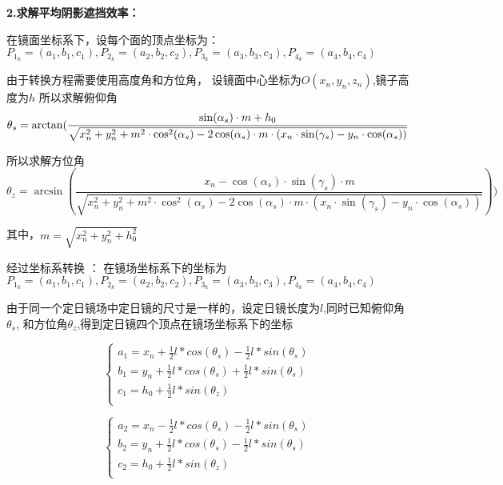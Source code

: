 \documentclass{数学建模}
\begin{document}
\textbf{2.求解平均阴影遮挡效率：}


在镜面坐标系下，设每个面的顶点坐标为：
$P_{1_k}=(a_1,b_1,c_1),P_{2_k}=(a_2,b_2,c_2),P_{3_k}=(a_3,b_3,c_3)
,P_{4_k}=(a_4,b_4,c_4)$

由于转换方程需要使用高度角和方位角，
设镜面中心坐标为$O(x_n,y_n,z_n)$,镜子高度为$h$
所以求解俯仰角
\begin{equation}
    \theta_s = \arctan(\frac{\sin (\alpha_s) \cdot m + h_0}{\sqrt{x_{n}^2 + y_{n}^2 + m^2 \cdot \cos ^2(\alpha_s) - 2 \cos (\alpha_s) \cdot m \cdot (x_{n} \cdot \sin (\gamma_s) - y_{n} \cdot \cos (\alpha_s))} } \\
\end{equation}

所以求解方位角
\begin{equation}
    \theta_z = \arcsin (\frac{x_{n} - \cos (\alpha_s) \cdot \sin (\gamma_s) \cdot m}{\sqrt{x_{n}^2 + y_{n}^2 + m^2 \cdot \cos ^2(\alpha_s) - 2 \cos (\alpha_s) \cdot m \cdot (x_{n} \cdot \sin (\gamma_s) - y_{n} \cdot \cos (\alpha_s))} } ))
\end{equation}

其中，$m=\sqrt{x_{n}^2+y_{n}^2+h_{0}^2} $

经过坐标系转换 ：
在镜场坐标系下的坐标为
$P_{1_k}=(a_1,b_1,c_1),P_{2_k}=(a_2,b_2,c_2),P_{3_k}=(a_3,b_3,c_3),
P_{4_k}=(a_4,b_4,c_4)$

由于同一个定日镜场中定日镜的尺寸是一样的，设定日镜长度为$l$,同时已知俯仰角$\theta_s$,
和方位角$\theta_z$,得到定日镜四个顶点在镜场坐标系下的坐标

\begin{equation}
    \begin{cases}
        a_1 = x_n + \frac{1}{2}l*cos(\theta_s) -  \frac{1}{2}l*sin(\theta_s) \\
        b_1 = y_n + \frac{1}{2}l*cos(\theta_s) +  \frac{1}{2}l*sin(\theta_s) \\
        c_1 = h_0 + \frac{1}{2}l*sin(\theta_z)  \\
    \end{cases}
\end{equation}

\begin{equation}
    \begin{cases}
        a_2 = x_n - \frac{1}{2}l*cos(\theta_s) -  \frac{1}{2}l*sin(\theta_s) \\
        b_2 = y_n + \frac{1}{2}l*cos(\theta_s) -  \frac{1}{2}l*sin(\theta_s) \\
        c_2 = h_0 + \frac{1}{2}l*sin(\theta_z)  \\
    \end{cases}
\end{equation}
\end{document}
